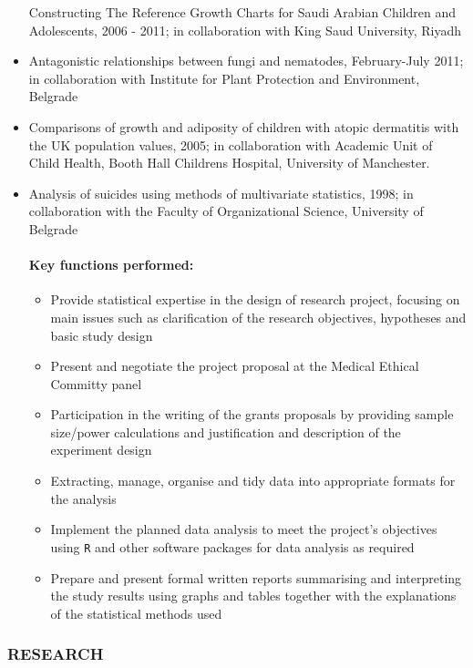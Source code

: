 \documentclass[
]{article}
\providecommand{\tightlist}{%
  \setlength{\itemsep}{0pt}\setlength{\parskip}{0pt}}
\begin{document}
\begin{itemize}
  Constructing The Reference Growth Charts for Saudi Arabian Children
  and Adolescents, 2006 - 2011; in collaboration with King Saud
  University, Riyadh
\item
  Antagonistic relationships between fungi and nematodes, February-July
  2011; in collaboration with Institute for Plant Protection and
  Environment, Belgrade
\item
  Comparisons of growth and adiposity of children with atopic dermatitis
  with the UK population values, 2005; in collaboration with Academic
  Unit of Child Health, Booth Hall Childrens Hospital, University of
  Manchester.
\item
  Analysis of suicides using methods of multivariate statistics, 1998;
  in collaboration with the Faculty of Organizational Science,
  University of Belgrade

  \hypertarget{key-functions-performed}{%
  \paragraph{Key functions performed:}\label{key-functions-performed}}

  \begin{itemize}
  \tightlist
  \item
    Provide statistical expertise in the design of research project,
    focusing on main issues such as clarification of the research
    objectives, hypotheses and basic study design
  \item
    Present and negotiate the project proposal at the Medical Ethical
    Committy panel
  \item
    Participation in the writing of the grants proposals by providing
    sample size/power calculations and justification and description of
    the experiment design
  \item
    Extracting, manage, organise and tidy data into appropriate formats
    for the analysis
  \item
    Implement the planned data analysis to meet the project's objectives
    using \texttt{R} and other software packages for data analysis as
    required
  \item
    Prepare and present formal written reports summarising and
    interpreting the study results using graphs and tables together with
    the explanations of the statistical methods used
  \end{itemize}
\end{itemize}

\hypertarget{research}{%
\subsubsection{RESEARCH}\label{research}}
\end{document}
